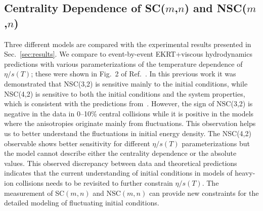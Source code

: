\subsection{Centrality Dependence of SC($m$,$n$) and NSC($m$,$n$)}
\label{sec:theory_allorder}
Three different models are compared with the experimental results presented in Sec.~\ref{sec:results}. 
We compare to event-by-event EKRT+viscous hydrodynamics predictions with various parameterizations of the temperature dependence of $\eta/s(T)$; these were shown in Fig.~2 of Ref.~\cite{ALICE:2016kpq}.
In this previous work it was demonstrated that NSC(3,2) is sensitive mainly to the initial conditions, while NSC(4,2) is sensitive to both the initial conditions and the system properties, which is consistent with the predictions from~\cite{Niemi:2012aj}.
However, the sign of NSC(3,2) is negative in the data in 0--10\% central collisions while it is positive in the models where the anisotropies originate mainly from fluctuations.
This observation helps us to better understand the fluctuations in initial energy density.
The NSC(4,2) observable shows better sensitivity for different $\eta/s(T)$ parameterizations but the model cannot describe either the centrality dependence or the absolute values. This observed discrepancy between data and theoretical predictions indicates that the current understanding of initial conditions in models of heavy-ion collisions needs to be revisited to further constrain $\eta/s(T)$.
The measurement of SC$(m,n)$ and NSC$(m,n)$ can provide new constraints for the detailed modeling of fluctuating initial conditions.

